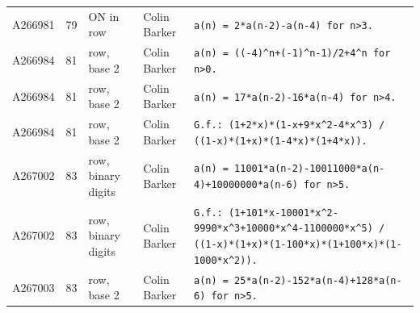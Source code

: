 \documentclass[11pt]{article}
\theoremstyle{definition}
\theoremstyle{remark}
\begin{document}
{\begin{longtable}{p{1.3cm}p{0.7cm}p{2.4cm}p{2.3cm}p{7.3cm}}
A266981 & 79 & ON in row & Colin Barker & \texttt{a(n)\allowbreak{} \allowbreak{}=\allowbreak{} \allowbreak{}2*\allowbreak{}a(n-\allowbreak{}2)\allowbreak{}-\allowbreak{}a(n-\allowbreak{}4)\allowbreak{} \allowbreak{}for \allowbreak{}n>3.} \\
A266984 & 81 & row, base 2 & Colin Barker & \texttt{a(n)\allowbreak{} \allowbreak{}=\allowbreak{} \allowbreak{}((-\allowbreak{}4)\allowbreak{}\^{}n+\allowbreak{}(-\allowbreak{}1)\allowbreak{}\^{}n-\allowbreak{}1)\allowbreak{}/\allowbreak{}2+\allowbreak{}4\^{}n \allowbreak{}for \allowbreak{}n>0.} \\
A266984 & 81 & row, base 2 & Colin Barker & \texttt{a(n)\allowbreak{} \allowbreak{}=\allowbreak{} \allowbreak{}17*\allowbreak{}a(n-\allowbreak{}2)\allowbreak{}-\allowbreak{}16*\allowbreak{}a(n-\allowbreak{}4)\allowbreak{} \allowbreak{}for \allowbreak{}n>4.} \\
A266984 & 81 & row, base 2 & Colin Barker & \texttt{G.f.: \allowbreak{}(1+\allowbreak{}2*\allowbreak{}x)\allowbreak{}*\allowbreak{}(1-\allowbreak{}x+\allowbreak{}9*\allowbreak{}x\^{}2-\allowbreak{}4*\allowbreak{}x\^{}3)\allowbreak{} \allowbreak{}/\allowbreak{} \allowbreak{}((1-\allowbreak{}x)\allowbreak{}*\allowbreak{}(1+\allowbreak{}x)\allowbreak{}*\allowbreak{}(1-\allowbreak{}4*\allowbreak{}x)\allowbreak{}*\allowbreak{}(1+\allowbreak{}4*\allowbreak{}x)\allowbreak{})\allowbreak{}.} \\
A267002 & 83 & row, binary digits & Colin Barker & \texttt{a(n)\allowbreak{} \allowbreak{}=\allowbreak{} \allowbreak{}11001*\allowbreak{}a(n-\allowbreak{}2)\allowbreak{}-\allowbreak{}10011000*\allowbreak{}a(n-\allowbreak{}4)\allowbreak{}+\allowbreak{}10000000*\allowbreak{}a(n-\allowbreak{}6)\allowbreak{} \allowbreak{}for \allowbreak{}n>5.} \\
A267002 & 83 & row, binary digits & Colin Barker & \texttt{G.f.: \allowbreak{}(1+\allowbreak{}101*\allowbreak{}x-\allowbreak{}10001*\allowbreak{}x\^{}2-\allowbreak{}9990*\allowbreak{}x\^{}3+\allowbreak{}10000*\allowbreak{}x\^{}4-\allowbreak{}1100000*\allowbreak{}x\^{}5)\allowbreak{} \allowbreak{}/\allowbreak{} \allowbreak{}((1-\allowbreak{}x)\allowbreak{}*\allowbreak{}(1+\allowbreak{}x)\allowbreak{}*\allowbreak{}(1-\allowbreak{}100*\allowbreak{}x)\allowbreak{}*\allowbreak{}(1+\allowbreak{}100*\allowbreak{}x)\allowbreak{}*\allowbreak{}(1-\allowbreak{}1000*\allowbreak{}x\^{}2)\allowbreak{})\allowbreak{}.} \\
A267003 & 83 & row, base 2 & Colin Barker & \texttt{a(n)\allowbreak{} \allowbreak{}=\allowbreak{} \allowbreak{}25*\allowbreak{}a(n-\allowbreak{}2)\allowbreak{}-\allowbreak{}152*\allowbreak{}a(n-\allowbreak{}4)\allowbreak{}+\allowbreak{}128*\allowbreak{}a(n-\allowbreak{}6)\allowbreak{} \allowbreak{}for \allowbreak{}n>5.} \\

\end{longtable}}
\end{document}
